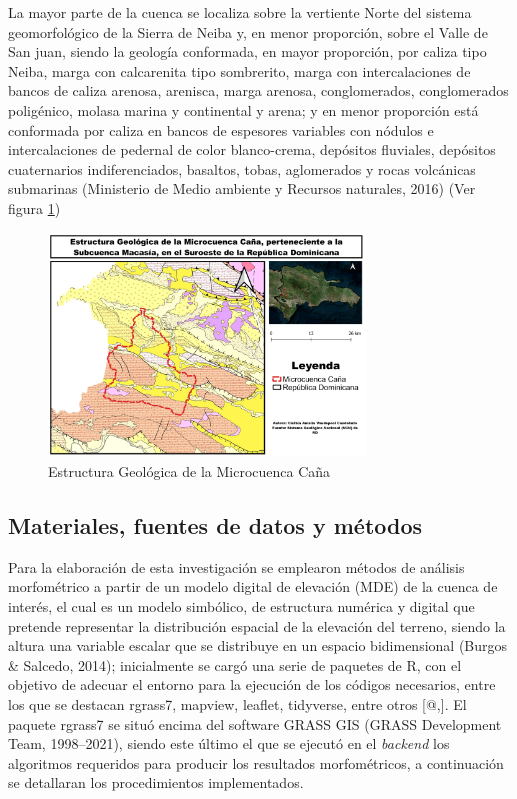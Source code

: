 \documentclass[11pt,]{article}
\begin{document}
La mayor parte de la cuenca se localiza sobre la vertiente Norte del
sistema geomorfológico de la Sierra de Neiba y, en menor proporción,
sobre el Valle de San juan, siendo la geología conformada, en mayor
proporción, por caliza tipo Neiba, marga con calcarenita tipo
sombrerito, marga con intercalaciones de bancos de caliza arenosa,
arenisca, marga arenosa, conglomerados, conglomerados poligénico, molasa
marina y continental y arena; y en menor proporción está conformada por
caliza en bancos de espesores variables con nódulos e intercalaciones de
pedernal de color blanco-crema, depósitos fluviales, depósitos
cuaternarios indiferenciados, basaltos, tobas, aglomerados y rocas
volcánicas submarinas (Ministerio de Medio ambiente y Recursos
naturales, 2016) (Ver figura \ref{mapageologico})

\begin{figure}
\centering
\includegraphics[width=0.75000\textwidth]{mapa_geologico_cuenca_cana.jpg}
\caption{Estructura Geológica de la Microcuenca
Caña\label{mapageologico}}
\end{figure}

\subsection{Materiales, fuentes de datos y
métodos}\label{materiales-fuentes-de-datos-y-muxe9todos}

Para la elaboración de esta investigación se emplearon métodos de
análisis morfométrico a partir de un modelo digital de elevación (MDE)
de la cuenca de interés, el cual es un modelo simbólico, de estructura
numérica y digital que pretende representar la distribución espacial de
la elevación del terreno, siendo la altura una variable escalar que se
distribuye en un espacio bidimensional (Burgos \& Salcedo, 2014);
inicialmente se cargó una serie de paquetes de R, con el objetivo de
adecuar el entorno para la ejecución de los códigos necesarios, entre
los que se destacan rgrass7, mapview, leaflet, tidyverse, entre otros
{[}@,{]}. El paquete rgrass7 se situó encima del software GRASS GIS
(GRASS Development Team, 1998--2021), siendo este último el que se
ejecutó en el \emph{backend} los algoritmos requeridos para producir los
resultados morfométricos, a continuación se detallaran los
procedimientos implementados.
\end{document}
